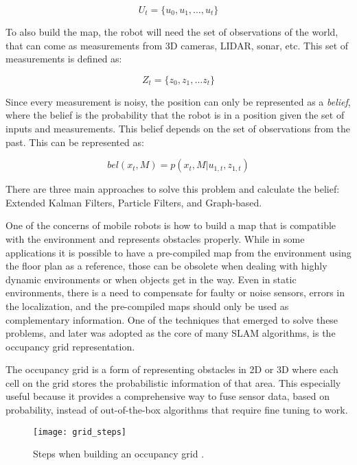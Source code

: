 \begin{equation}
    U_t = \{u_0, u_1, \dots, u_t\}
\end{equation}

To also build the map, the robot will need the set of observations of the world, that can come as measurements from 3D cameras, LIDAR, sonar, etc. This set of measurements is defined as:

\begin{equation}
    Z_t = \{z_0, z_1, \dots z_t\}
\end{equation}

Since every measurement is noisy, the position can only be represented as a \textit{belief}, where the belief is the probability that the robot is in a position given the set of inputs and measurements. This belief depends on the set of observations from the past. This can be represented as:

\begin{equation}
    bel(x_t, M) = p(x_t, M | u_{1, t}, z_{1,t})
\end{equation}

There are three main approaches to solve this problem and calculate the belief: Extended Kalman Filters, Particle Filters, and Graph-based.

One of the concerns of mobile robots is how to build a map that is compatible with the environment and represents obstacles properly. While in some applications it is possible to have a pre-compiled map from the environment using the floor plan as a reference, those can be obsolete when dealing with highly dynamic environments or when objects get in the way. Even in static environments, there is a need to compensate for faulty or noise sensors, errors in the localization, and the pre-compiled maps should only be used as complementary information. One of the techniques that emerged to solve these problems, and later was adopted as the core of many SLAM algorithms, is the occupancy grid \cite{elfes1989using} representation.

The occupancy grid is a form of representing obstacles in 2D or 3D where each cell on the grid stores the probabilistic information of that area. This especially useful because it provides a comprehensive way to fuse sensor data, based on probability, instead of out-of-the-box algorithms that require fine tuning to work.

\begin{figure}[!ht]
    \centering
    \texttt{[image: grid\_steps]}
    \caption{Steps when building an occupancy grid \cite{elfes1989using}.}
    \label{fig:grid_steps}
\end{figure}


